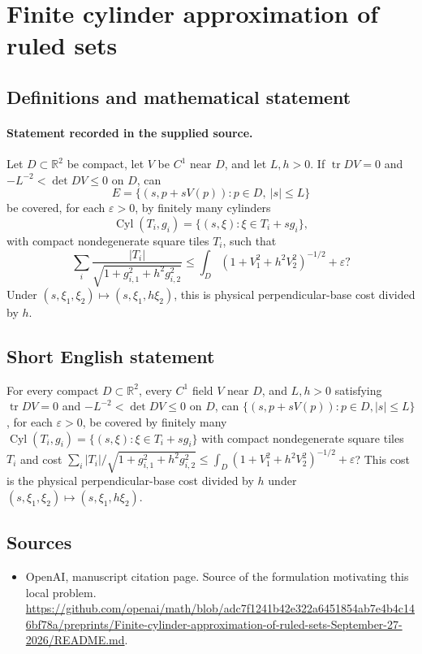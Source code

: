 \documentclass[11pt]{article}
\begin{document}
\section*{Finite cylinder approximation of ruled sets}\label{30007126}
\subsection{Definitions and mathematical statement}
\paragraph{Statement recorded in the supplied source.}
Let $D\subset\mathbb{R}^2$ be compact, let $V$ be $C^1$ near $D$, and let $L,h>0$. If $\operatorname{tr}DV=0$ and $-L^{-2}<\det DV\leq0$ on $D$, can
\[
E=\{(s,p+sV(p)):p\in D,\ |s|\leq L\}
\]
be covered, for each $\varepsilon>0$, by finitely many cylinders
\[
\operatorname{Cyl}(T_i,g_i)=\{(s,\xi):\xi\in T_i+sg_i\},
\]
with compact nondegenerate square tiles $T_i$, such that
\[
\sum_i\frac{|T_i|}{\sqrt{1+g_{i,1}^2+h^2g_{i,2}^2}}
\leq\int_D(1+V_1^2+h^2V_2^2)^{-1/2}+\varepsilon?
\]
Under $(s,\xi_1,\xi_2)\mapsto(s,\xi_1,h\xi_2)$, this is physical perpendicular-base cost divided by $h$.
\subsection{Short English statement}
For every compact $D\subset\mathbb{R}^2$, every $C^1$ field $V$ near $D$, and $L,h>0$ satisfying $\operatorname{tr}DV=0$ and $-L^{-2}<\det DV\leq0$ on $D$, can $\{(s,p+sV(p)):p\in D,|s|\leq L\}$, for each $\varepsilon>0$, be covered by finitely many $\operatorname{Cyl}(T_i,g_i)=\{(s,\xi):\xi\in T_i+sg_i\}$ with compact nondegenerate square tiles $T_i$ and cost $\sum_i|T_i|/\sqrt{1+g_{i,1}^2+h^2g_{i,2}^2}\leq\int_D(1+V_1^2+h^2V_2^2)^{-1/2}+\varepsilon$? This cost is the physical perpendicular-base cost divided by $h$ under $(s,\xi_1,\xi_2)\mapsto(s,\xi_1,h\xi_2)$.
\subsection{Sources}
\begin{itemize}
\item[S1] OpenAI, manuscript citation page. Source of the formulation motivating this local problem.
\url{https://github.com/openai/math/blob/adc7f1241b42e322a6451854ab7e4b4c146bf78a/preprints/Finite-cylinder-approximation-of-ruled-sets-September-27-2026/README.md}.
\end{itemize}
\end{document}
